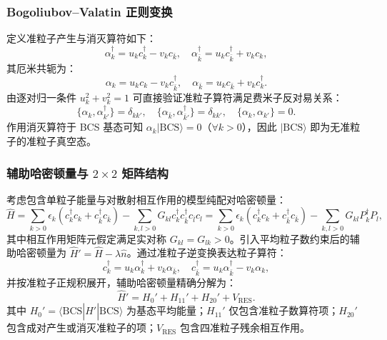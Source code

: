 \subsubsection{Bogoliubov–Valatin 正则变换}\label{sec:2-3-bogoliubovvalatin正则变换}


定义准粒子产生与消灭算符如下\cite{book-suhonen-from-nucleons-to-nucleus}：
\begin{equation}\label{eq:2-3-10}
\alpha_k^\dagger = u_k c_k^\dagger - v_k c_{\bar{k}}, \quad \alpha_{\bar{k}}^\dagger = u_k c_{\bar{k}}^\dagger + v_k c_k,
\end{equation}
其厄米共轭为：
\begin{equation}\label{eq:2-3-11}
\alpha_k = u_k c_k - v_k c_{\bar{k}}^\dagger, \quad \alpha_{\bar{k}} = u_k c_{\bar{k}} + v_k c_k^\dagger.
\end{equation}
由逐对归一条件 $u_k^2 + v_k^2 = 1$ 可直接验证准粒子算符满足费米子反对易关系：
\begin{equation}\label{eq:2-3-12}
\{\alpha_k, \alpha_{k'}^\dagger\} = \delta_{kk'}, \quad \{\alpha_{\bar{k}}, \alpha_{\bar{k}'}^\dagger\} = \delta_{kk'}, \quad \{\alpha_k, \alpha_{k'}\} = 0.
\end{equation}
作用消灭算符于 BCS 基态可知 $\alpha_k |\mathrm{BCS}\rangle = 0$（$\forall k > 0$），因此 $|\mathrm{BCS}\rangle$ 即为无准粒子的准粒子真空态。


\subsubsection{辅助哈密顿量与 $2\times 2$ 矩阵结构}\label{sec:2-3-辅助哈密顿量与2times2矩阵结构}


考虑包含单粒子能量与对散射相互作用的模型纯配对哈密顿量：
\begin{equation}\label{eq:2-3-13}
\hat{H} = \sum_{k>0} \epsilon_k \left( c_k^\dagger c_k + c_{\bar{k}}^\dagger c_{\bar{k}} \right) - \sum_{k, l > 0} G_{kl} c_k^\dagger c_{\bar{k}}^\dagger c_{\bar{l}} c_l = \sum_{k>0} \epsilon_k \left( c_k^\dagger c_k + c_{\bar{k}}^\dagger c_{\bar{k}} \right) - \sum_{k, l > 0} G_{kl} P_k^\dagger P_l,
\end{equation}
其中相互作用矩阵元假定满足实对称 $G_{kl} = G_{lk} > 0$。引入平均粒子数约束后的辅助哈密顿量为 $\hat{H}' = \hat{H} - \lambda \hat{n}$。通过准粒子逆变换表达粒子算符：
\begin{equation}\label{eq:2-3-14}
c_k^\dagger = u_k \alpha_k^\dagger + v_k \alpha_{\bar{k}}, \quad c_{\bar{k}}^\dagger = u_k \alpha_{\bar{k}}^\dagger - v_k \alpha_k,
\end{equation}
并按准粒子正规积展开，辅助哈密顿量精确分解为：
\begin{equation}\label{eq:2-3-15}
\hat{H}' = H_0' + H_{11}' + H_{20}' + V_{\mathrm{RES}}.
\end{equation}
其中 $H_0' = \langle\mathrm{BCS}| \hat{H}' |\mathrm{BCS}\rangle$ 为基态平均能量；$H_{11}'$ 仅包含准粒子数算符项；$H_{20}'$ 包含成对产生或消灭准粒子的项；$V_{\mathrm{RES}}$ 包含四准粒子残余相互作用。

